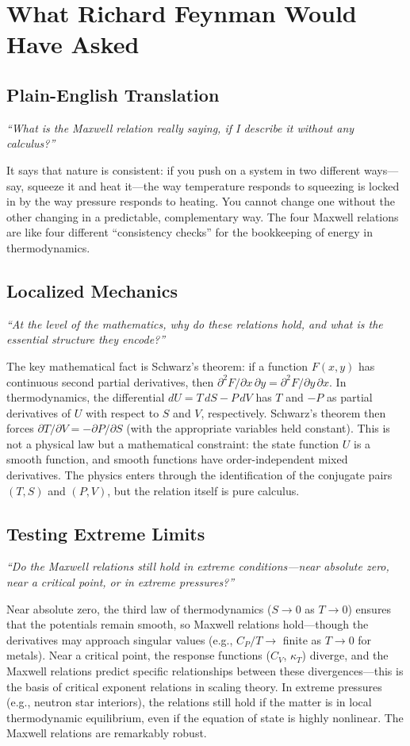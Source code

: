 \section*{What Richard Feynman Would Have Asked}

\subsection*{Plain-English Translation}
\textit{``What is the Maxwell relation really saying, if I describe it without any calculus?''}

It says that nature is consistent: if you push on a system in two different ways---say, squeeze it and heat it---the way temperature responds to squeezing is locked in by the way pressure responds to heating. You cannot change one without the other changing in a predictable, complementary way. The four Maxwell relations are like four different ``consistency checks'' for the bookkeeping of energy in thermodynamics.

\subsection*{Localized Mechanics}
\textit{``At the level of the mathematics, why do these relations hold, and what is the essential structure they encode?''}

The key mathematical fact is Schwarz's theorem: if a function $F(x,y)$ has continuous second partial derivatives, then $\partial^{2}F/\partial x\,\partial y = \partial^{2}F/\partial y\,\partial x$. In thermodynamics, the differential $dU = T\,dS - P\,dV$ has $T$ and $-P$ as partial derivatives of $U$ with respect to $S$ and $V$, respectively. Schwarz's theorem then forces $\partial T/\partial V = -\partial P/\partial S$ (with the appropriate variables held constant). This is not a physical law but a mathematical constraint: the state function $U$ is a smooth function, and smooth functions have order-independent mixed derivatives. The physics enters through the identification of the conjugate pairs $(T, S)$ and $(P, V)$, but the relation itself is pure calculus.

\subsection*{Testing Extreme Limits}
\textit{``Do the Maxwell relations still hold in extreme conditions---near absolute zero, near a critical point, or in extreme pressures?''}

Near absolute zero, the third law of thermodynamics ($S \to 0$ as $T \to 0$) ensures that the potentials remain smooth, so Maxwell relations hold---though the derivatives may approach singular values (e.g., $C_{P}/T \to$ finite as $T \to 0$ for metals). Near a critical point, the response functions ($C_{V}$, $\kappa_{T}$) diverge, and the Maxwell relations predict specific relationships between these divergences---this is the basis of critical exponent relations in scaling theory. In extreme pressures (e.g., neutron star interiors), the relations still hold if the matter is in local thermodynamic equilibrium, even if the equation of state is highly nonlinear. The Maxwell relations are remarkably robust.

